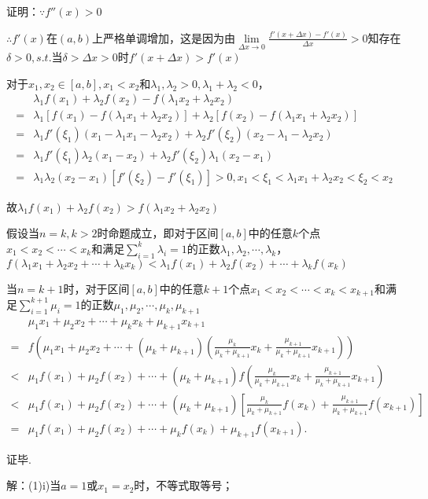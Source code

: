 \documentclass[12pt,UTF8]{ctexart}
\begin{document}
\begin{enumerate}
{证明：$\because f''(x)>0$

$\therefore f'(x)$在$(a,b)$上严格单调增加，这是因为由$\lim\limits_{\Delta x\rightarrow0}\frac{f'(x+\Delta x)-f'(x)}{\Delta x}>0$知存在$\delta>0,s.t.$当$\delta>\Delta x>0$时$f'(x+\Delta x)>f'(x)$

对于$x_1,x_2\in[a,b],x_1<x_2$和$\lambda_1,\lambda_2>0,\lambda_1+\lambda_2<0$，
\[\begin{split}
&\lambda_1f(x_1)+\lambda_2f(x_2)-f(\lambda_1x_2+\lambda_2x_2)\\
=&\lambda_1[f(x_1)-f(\lambda_1x_1+\lambda_2x_2)]+\lambda_2[f(x_2)-f(\lambda_1x_1+\lambda_2x_2)]\\
=&\lambda_1f'(\xi_1)(x_1-\lambda_1x_1-\lambda_2x_2)+\lambda_2f'(\xi_2)(x_2-\lambda_1-\lambda_2x_2)\\
=&\lambda_1f'(\xi_1)\lambda_2(x_1-x_2)+\lambda_2f'(\xi_2)\lambda_1(x_2-x_1)\\
=&\lambda_1\lambda_2(x_2-x_1)[f'(\xi_2)-f'(\xi_1)]>0,x_1<\xi_1<\lambda_1x_1+\lambda_2x_2<\xi_2<x_2
\end{split}\]

故$\lambda_1f(x_1)+\lambda_2f(x_2)>f(\lambda_1x_2+\lambda_2x_2)$

假设当$n=k,k>2$时命题成立，即对于区间$[a,b]$中的任意$k$个点$x_1<x_2<\cdots<x_k$和满足$\sum_{i=1}^k\lambda_i=1$的正数$\lambda_1,\lambda_2,\cdots,\lambda_k$，$f(\lambda_1x_1+\lambda_2x_2+\cdots+\lambda_kx_k)<\lambda_1f(x_1)+\lambda_2f(x_2)+\cdots+\lambda_kf(x_k)$

当$n=k+1$时，对于区间$[a,b]$中的任意$k+1$个点$x_1<x_2<\cdots<x_k<x_{k+1}$和满足$\sum_{i=1}^{k+1}\mu_i=1$的正数$\mu_1,\mu_2,\cdots,\mu_k,\mu_{k+1}$
\[\begin{split}
&\mu_1x_1+\mu_2x_2+\cdots+\mu_kx_k+\mu_{k+1}x_{k+1}\\
=&f(\mu_1x_1+\mu_2x_2+\cdots+(\mu_k+\mu_{k+1})(\frac{\mu_k}{\mu_k+\mu_{k+1}}x_k+\frac{\mu_{k+1}}{\mu_k+\mu_{k+1}}x_{k+1}))\\
<&\mu_1f(x_1)+\mu_2f(x_2)+\cdots+(\mu_k+\mu_{k+1})f(\frac{\mu_k}{\mu_k+\mu_{k+1}}x_k+\frac{\mu_{k+1}}{\mu_k+\mu_{k+1}}x_{k+1})\\
<&\mu_1f(x_1)+\mu_2f(x_2)+\cdots+(\mu_k+\mu_{k+1})[\frac{\mu_k}{\mu_k+\mu_{k+1}}f(x_k)+\frac{\mu_{k+1}}{\mu_k+\mu_{k+1}}f(x_{k+1})]\\
=&\mu_1f(x_1)+\mu_2f(x_2)+\cdots+\mu_kf(x_k)+\mu_{k+1}f(x_{k+1}).
\end{split}\]

证毕. }

解：(1)i)当$a=1$或$x_1=x_2$时，不等式取等号；


\end{enumerate}
\end{document}
